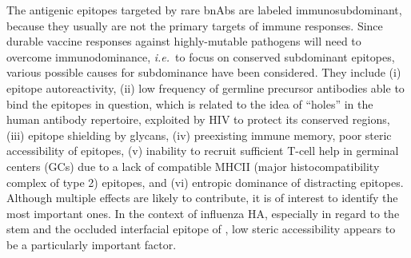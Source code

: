 \documentclass[utf8]{frontiersHLTH}%
\newcommand{\cred}[1]{\textsf{\color{red}#1}}
\def\ie {{\it i.e.}}
\begin{document}
The antigenic epitopes targeted by rare bnAbs are labeled immunosubdominant, because
they usually are not the primary targets of immune responses.
Since durable vaccine responses against highly-mutable pathogens will need
to overcome immunodominance, \ie~to focus on conserved subdominant epitopes,
various possible causes for subdominance have been considered. They include
(i) epitope autoreactivity,\cite{bajic19a} (ii) low frequency of \cred{germline} precursor
antibodies able to bind the epitopes in question,\cite{andrews15}
\cred{which is related to the idea of ``holes'' in the human antibody repertoire, exploited by HIV to protect its conserved regions\cite{xiao09},}
(iii) epitope shielding by glycans,\cite{bajic19} (iv) preexisting immune
memory,\cite{andrews15,arevalo20} poor steric accessibility of
epitopes\cite{amitai20}, (v) inability to recruit sufficient T-cell help
in germinal centers (GCs) due to a lack of compatible MHCII (major histocompatibility complex of type 2) epitopes,\cite{tan19}
and (vi) entropic dominance of distracting epitopes.\cite{wang17,amitai20,glanville20}
Although multiple effects are likely to contribute, it
is of interest to identify the most important ones. In the
context of influenza HA, especially in regard to the stem and the occluded
interfacial epitope of \citet{watanabe19}, low steric accessibility appears
to be a particularly important factor.
\end{document}
